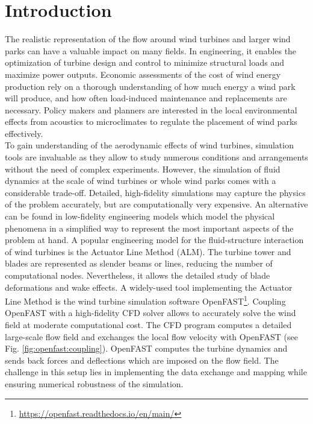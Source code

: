 \section{Introduction}
\label{section:introduction}

The realistic representation of the flow around wind turbines and larger wind parks can have a valuable impact on many fields. In engineering, it enables the optimization of turbine design and control to minimize structural loads and maximize power outputs. Economic assessments of the cost of wind energy production rely on a thorough understanding of how much energy a wind park will produce, and how often load-induced maintenance and replacements are necessary. Policy makers and planners are interested in the local environmental effects from acoustics to microclimates to regulate the placement of wind parks effectively.\\

To gain understanding of the aerodynamic effects of wind turbines, simulation tools are invaluable as they allow to study numerous conditions and arrangements without the need of complex experiments. However, the simulation of fluid dynamics at the scale of wind turbines or whole wind parks comes with a considerable trade-off. Detailed, high-fidelity simulations may capture the physics of the problem accurately, but are computationally very expensive. An alternative can be found in low-fidelity engineering models which model the physical phenomena in a simplified way to represent the most important aspects of the problem at hand. A popular engineering model for the fluid-structure interaction of wind turbines is the Actuator Line Method (ALM). The turbine tower and blades are represented as slender beams or lines, reducing the number of computational nodes. Nevertheless, it allows the detailed study of blade deformations and wake effects. 
A widely-used tool implementing the Actuator Line Method is the wind turbine simulation software OpenFAST\footnote{\url{https://openfast.readthedocs.io/en/main/}}. Coupling OpenFAST with a high-fidelity CFD solver allows to accurately solve the wind field at moderate computational cost. 
The CFD program computes a detailed large-scale flow field and exchanges the local flow velocity with OpenFAST (see Fig. \ref{fig:openfast:coupling}). OpenFAST computes the turbine dynamics and sends back forces and deflections which are imposed on the flow field. The challenge in this setup lies in implementing the data exchange and mapping while ensuring numerical robustness of the simulation.\\

